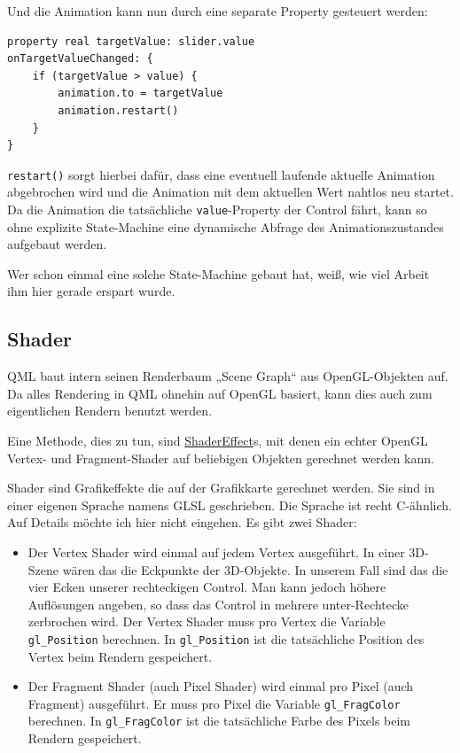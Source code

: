 \documentclass[a4paper]{article}
\begin{document}
Und die Animation kann nun durch eine separate Property gesteuert werden:

\begin{verbatim}
property real targetValue: slider.value
onTargetValueChanged: {
    if (targetValue > value) {
        animation.to = targetValue
        animation.restart()
    }
}
\end{verbatim}

\verb~restart()~ sorgt hierbei dafür, dass eine eventuell laufende aktuelle Animation abgebrochen wird und die Animation mit dem aktuellen Wert nahtlos neu startet. Da die Animation die tatsächliche \verb~value~-Property der Control fährt, kann so ohne explizite State-Machine eine dynamische Abfrage des Animationszustandes aufgebaut werden.

Wer schon einmal eine solche State-Machine gebaut hat, weiß, wie viel Arbeit ihm hier gerade erspart wurde.
\subsection{Shader}
\label{sec-3-5}
QML baut intern seinen Renderbaum „Scene Graph“ aus OpenGL-Objekten auf. Da alles Rendering in QML ohnehin auf OpenGL basiert, kann dies auch zum eigentlichen Rendern benutzt werden.

Eine Methode, dies zu tun, sind \href{http://qt-project.org/doc/qt-5/qml-qtquick-shadereffect.html}{ShaderEffect}s, mit denen ein echter OpenGL Vertex- und Fragment-Shader auf beliebigen Objekten gerechnet werden kann.

Shader sind Grafikeffekte die auf der Grafikkarte gerechnet werden. Sie sind in einer eigenen Sprache namens GLSL geschrieben. Die Sprache ist recht C-ähnlich. Auf Details möchte ich hier nicht eingehen. Es gibt zwei Shader:
\begin{itemize}
\item Der Vertex Shader wird einmal auf jedem Vertex ausgeführt. In einer 3D-Szene wären das die Eckpunkte der 3D-Objekte. In unserem Fall sind das die vier Ecken unserer rechteckigen Control. Man kann jedoch höhere Auflösungen angeben, so dass das Control in mehrere unter-Rechtecke zerbrochen wird. Der Vertex Shader muss pro Vertex die Variable \verb~gl_Position~ berechnen. In \verb~gl_Position~ ist die tatsächliche Position des Vertex beim Rendern gespeichert.
\item Der Fragment Shader (auch Pixel Shader) wird einmal pro Pixel (auch Fragment) ausgeführt. Er muss pro Pixel die Variable \verb~gl_FragColor~ berechnen. In \verb~gl_FragColor~ ist die tatsächliche Farbe des Pixels beim Rendern gespeichert.
\end{itemize}
\end{document}
